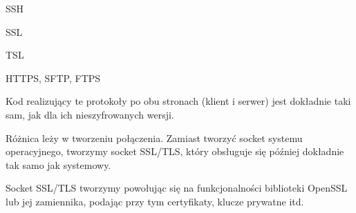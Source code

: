 \begin{frame}{SSH}
	
\end{frame}

\begin{frame}{SSL}
	
\end{frame}

\begin{frame}{TSL}
	
\end{frame}

\begin{frame}{HTTPS, SFTP, FTPS}
	
	Kod realizujący te protokoły po obu stronach (klient i serwer) jest dokładnie taki sam, jak dla ich nieszyfrowanych wersji.
	
	Różnica leży w tworzeniu połączenia. Zamiast tworzyć socket systemu operacyjnego, tworzymy socket SSL/TLS, który obsługuje się później dokładnie tak samo jak systemowy.
	
	Socket SSL/TLS tworzymy powołując się na funkcjonalności biblioteki OpenSSL lub jej zamiennika, podając przy tym certyfikaty, klucze prywatne itd.
	
\end{frame}

